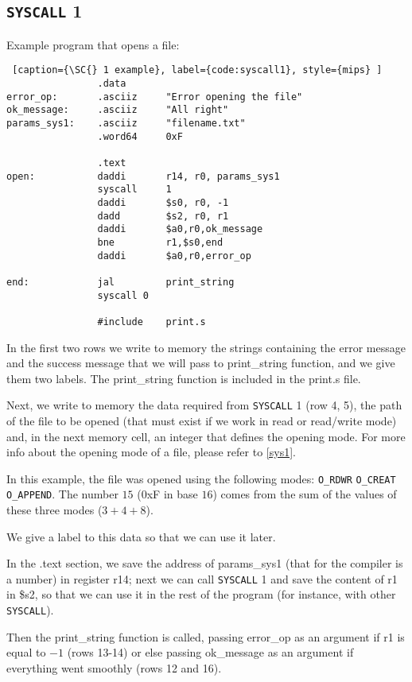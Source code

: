 \documentclass[12pt]{report}
\newcommand{\SC}{\texttt{SYSCALL}}
\begin{document}
\subsection{\SC{} 1}
Example program that opens a file:
\begin{lstlisting} [caption={\SC{} 1 example}, label={code:syscall1}, style={mips} ] 
                .data 
error_op:       .asciiz     "Error opening the file"    
ok_message:     .asciiz     "All right"
params_sys1:    .asciiz     "filename.txt"
                .word64     0xF                    

                .text
open:           daddi       r14, r0, params_sys1    
                syscall     1    
                daddi       $s0, r0, -1
                dadd        $s2, r0, r1        
                daddi       $a0,r0,ok_message            
                bne         r1,$s0,end            
                daddi       $a0,r0,error_op

end:            jal         print_string
                syscall 0
        
                #include    print.s      
\end{lstlisting}
In the first two rows we write to memory the strings containing the error
message and the success message that we will pass to print\_string function, and
we give them two labels. The print\_string function is included in the print.s
file.

Next, we write to memory the data required from \SC{} 1 (row 4, 5), the path of
the file to be opened (that must exist if we work in read or read/write mode)
and, in the next memory cell, an integer that defines the opening mode. For more
info about the opening mode of a file, please refer to \ref{sys1}.

In this example, the file was opened using the following modes: 
\texttt{O\_RDWR} \textbar{} \texttt{O\_CREAT} \textbar{} \texttt{O\_APPEND}. The
number $15$ (0xF in base $16$) comes from the sum of the values of these three
modes ($3 + 4 + 8$).

We give a label to this data so that we can use it later.

In the .text section, we save the address of params\_sys1 (that for the compiler
is a number) in register r14; next we can call \SC{} 1 and save the content of
r1 in \$s2, so that we can use it in the rest of the program (for instance, with
other \SC{}).

Then the print\_string function is called, passing error\_op as an argument if
r1 is equal to $-1$ (rows 13-14) or else passing ok\_message as an argument if
everything went smoothly (rows 12 and 16).
\end{document}
